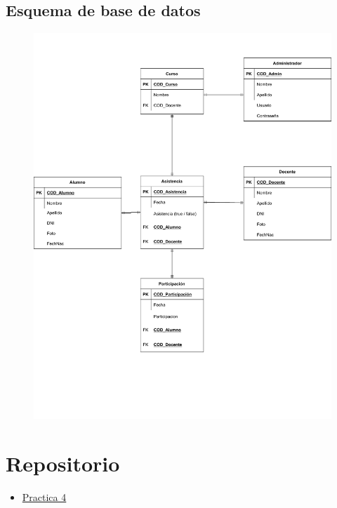 \documentclass{article}
\begin{document}
\subsection{Esquema de base de datos}
\begin{figure}[htp]
    \centering
    \includegraphics[scale=0.6]{export.pdf}
\end{figure}

%

\nocite{*}

%

\section{Repositorio}\label{sec:Repositorio}
\begin{itemize}
    \item {\color{blue}\href{https://github.com/pintovillamar/software-construction/tree/main/pract04-latex}{Practica 4}}
\end{itemize}
\end{document}
